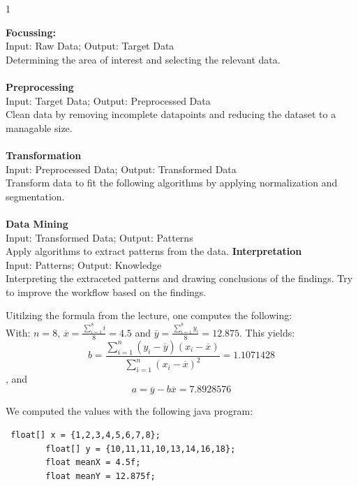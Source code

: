 \documentclass{article}
\begin{document}
\begin{ukon-infie}[01.11.17]{1}
\begin{exercise}[p=7.5]{}
\textbf{Focussing:}\\
Input: Raw Data; Output: Target Data\\
Determining the area of interest and selecting the relevant data.\\\\
\textbf{Preprocessing}\\
Input: Target Data; Output: Preprocessed Data\\
Clean data by removing incomplete datapoints and reducing the dataset to a managable size.\\\\
\textbf{Transformation}\\
Input: Preprocessed Data; Output: Transformed Data\\
Transform data to fit the following algorithms by applying normalization and segmentation.\\\\
\textbf{Data Mining}\\
Input: Transformed Data; Output: Patterns\\
Apply algorithms to extract patterns from the data.\newpage
\textbf{Interpretation}\\
Input: Patterns; Output: Knowledge\\
Interpreting the extraceted patterns and  drawing conclusions of the findings. Try to improve the workflow based on the findings. 

\end{exercise}


\begin{exercise}[p=7.5]{}
\question{}Uitilzing the formula from the lecture, one computes the following: \\
 
 With: $n = 8$, $\overline{x} = \frac{\sum_{i = 1}^8 i}{8} = 4.5$ and $\overline{y} = \frac{\sum_{i = 1}^8 y_i}{8} = 12.875$. This yields: \\
 $$ b = \frac{\sum_{i = 1}^n(y_i - \overline{y})(x_i - \overline{x})}{\sum_{i = 1}^n(x_i - \overline{x})^2} = 1.1071428$$, and
 $$ a = \overline{y} - b \overline{x} = 7.8928576$$
 
 We computed the values with the following java program: \\
 \begin{verbatim}
 float[] x = {1,2,3,4,5,6,7,8};
        float[] y = {10,11,11,10,13,14,16,18};
        float meanX = 4.5f;
        float meanY = 12.875f;


\end{verbatim}
\end{exercise}
\end{ukon-infie}
\end{document}
